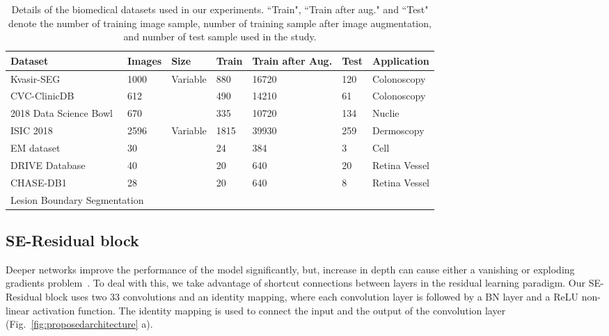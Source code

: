 \documentclass[journal]{IEEEtran}
\begin{document}
\begin{table*} [t!]
\footnotesize
 \caption{{Details of the biomedical datasets used in our experiments. ``Train", ``Train after aug." and ``Test" denote the number of training image sample, number of training sample after image augmentation, and number of test sample used in the study. }}
    \label{table:datasettable}
    \centering
          \begin{tabular}{@{}l|l|l|l|l|l|l@{}} 
            \toprule
        \textbf{Dataset} &\textbf{Images} &\textbf{Size}  &\textbf{Train} &\textbf{Train after Aug.} & \textbf{Test} &\textbf{Application}\\ 
              \hline
              \hline
Kvasir-SEG~\cite{jha2020kvasir} & 1000 & Variable & 880 & 16720 & 120 &Colonoscopy\\  CVC-ClinicDB~\cite{bernal2015wm} & 612 &  & 490 & 14210 & 61 &Colonoscopy\\  2018 Data Science Bowl~\cite{caicedo2019nucleus} & 670 &  & 335 & 10720 & 134 & Nuclie \\  ISIC 2018  ~\cite{codella2018skin,tschandl2018ham10000}& 2596 & Variable & 1815 & 39930 & 259 & Dermoscopy\\ EM dataset~\cite{cardona2010integrated} & 30 &  & 24 & 384 & 3 & Cell \\DRIVE Database~\cite{staal2004ridge} & 40 &  & 20 & 640 & 20 & Retina Vessel\\CHASE-DB1~\cite{owen2009measuring} & 28 &  & 20 & 640 & 8 & Retina Vessel\\\bottomrule
        \multicolumn{4}{l}{{ Lesion Boundary Segmentation}}
\end{tabular}
\vspace{-5mm}
\end{table*}	

\subsection{SE-Residual block}
Deeper networks improve the performance of the model significantly, but, increase in depth can cause either a vanishing or exploding gradients problem~\cite{he2016deep}. To deal with this, we take advantage of shortcut connections between layers in the residual learning paradigm. Our SE-Residual block uses two 33 convolutions and an identity mapping, where each convolution layer is followed by a \ac{BN} layer and a \ac{ReLU} non-linear activation function. The identity mapping is used to connect the input and the output of the convolution layer (Fig.~\ref{fig:proposedarchitecture} a). 
\end{document}
